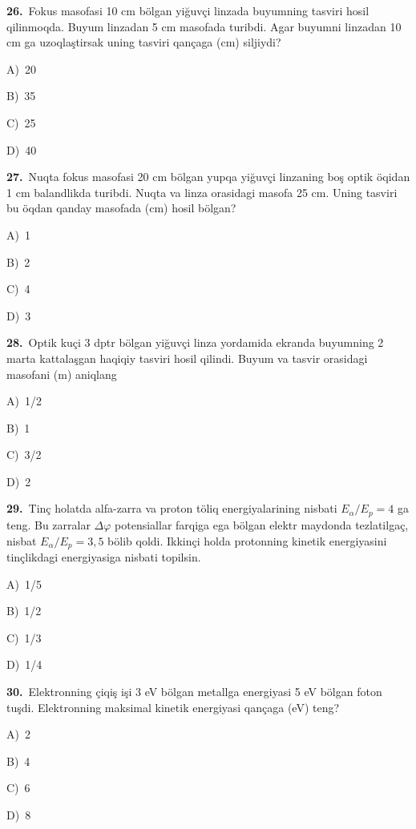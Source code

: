 \documentclass[11pt,a4paper]{article}
\newcommand{\opt}[2]{\hspace*{4mm}#1)\ #2\par}
\begin{document}
\noindent\begin{minipage}{\linewidth}
\textbf{26.}\ Fokus masofasi 10 cm bölgan yiğuvçi linzada buyumning tasviri hosil qilinmoqda. Buyum linzadan 5 cm masofada turibdi. Agar buyumni linzadan 10 cm ga uzoqlaştirsak uning tasviri qançaga (cm) siljiydi?\par\smallskip
\opt{A}{20}
\opt{B}{35}
\opt{C}{25}
\opt{D}{40}
\end{minipage}\vspace{9pt}\par
\noindent\begin{minipage}{\linewidth}
\textbf{27.}\ Nuqta fokus masofasi 20 cm bölgan yupqa yiğuvçi linzaning boş optik öqidan 1 cm balandlikda turibdi. Nuqta va linza orasidagi masofa 25 cm. Uning tasviri bu öqdan qanday masofada (cm) hosil bölgan?\par\smallskip
\opt{A}{1}
\opt{B}{2}
\opt{C}{4}
\opt{D}{3}
\end{minipage}\vspace{9pt}\par
\noindent\begin{minipage}{\linewidth}
\textbf{28.}\ Optik kuçi 3 dptr bölgan yiğuvçi linza yordamida ekranda buyumning 2 marta kattalaşgan haqiqiy tasviri hosil qilindi. Buyum va tasvir orasidagi masofani (m) aniqlang\par\smallskip
\opt{A}{1/2}
\opt{B}{1}
\opt{C}{3/2}
\opt{D}{2}
\end{minipage}\vspace{9pt}\par
\noindent\begin{minipage}{\linewidth}
\textbf{29.}\ Tinç holatda alfa-zarra va proton töliq energiyalarining nisbati $E_\alpha/E_p=4$ ga teng. Bu zarralar $\Delta\varphi$ potensiallar farqiga ega bölgan elektr maydonda tezlatilgaç, nisbat $E_\alpha/E_p=3{,}5$ bölib qoldi. Ikkinçi holda protonning kinetik energiyasini tinçlikdagi energiyasiga nisbati topilsin.\par\smallskip
\opt{A}{1/5}
\opt{B}{1/2}
\opt{C}{1/3}
\opt{D}{1/4}
\end{minipage}\vspace{9pt}\par
\noindent\begin{minipage}{\linewidth}
\textbf{30.}\ Elektronning çiqiş işi 3 eV bölgan metallga energiyasi 5 eV bölgan foton tuşdi. Elektronning maksimal kinetik energiyasi qançaga (eV) teng?\par\smallskip
\opt{A}{2}
\opt{B}{4}
\opt{C}{6}
\opt{D}{8}
\end{minipage}\vspace{9pt}\par
\end{document}
